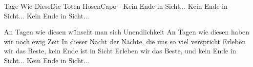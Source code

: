 \begin{song}{Tage Wie Diese}{Die Toten Hosen}{Capo -}
Kein Ende in Sicht...
Kein Ende in Sicht...
Kein Ende in Sicht...

An Tagen wie diesen wünscht man sich Unendlichkeit
An Tagen wie diesen haben wir noch ewig Zeit                                                                      
In dieser Nacht der Nächte, die uns so viel verspricht
Erleben wir das Beste, kein Ende ist in Sicht
Erleben wir das Beste, und kein Ende in Sicht...
Kein Ende in Sicht...

\end{song}
